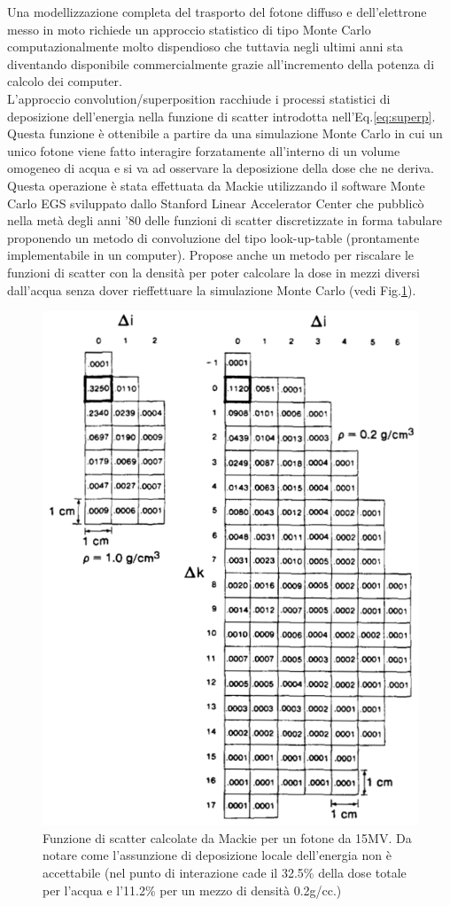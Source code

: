 {Una modellizzazione completa del trasporto del fotone diffuso e dell'elettrone messo in moto richiede un approccio statistico di tipo Monte Carlo computazionalmente molto dispendioso che tuttavia negli ultimi anni sta diventando disponibile commercialmente grazie all'incremento della potenza di calcolo dei computer.\\
L'approccio convolution/superposition racchiude i processi statistici di deposizione dell'energia nella funzione di scatter introdotta nell'Eq.\eqref{eq:superp}.\\
Questa funzione è ottenibile a partire da una simulazione Monte Carlo in cui un unico fotone viene fatto interagire forzatamente all'interno di un volume omogeneo di acqua e si va ad osservare la deposizione della dose che ne deriva.\\
Questa operazione è stata effettuata da Mackie \cite{Mackie1985} utilizzando il software Monte Carlo EGS sviluppato dallo Stanford Linear Accelerator Center che pubblicò nella metà degli anni '80 delle funzioni di scatter discretizzate in forma tabulare proponendo un metodo di convoluzione del tipo look-up-table (prontamente implementabile in un computer). Propose anche un metodo per riscalare le funzioni di scatter con la densità per poter calcolare la dose in mezzi diversi dall'acqua senza dover rieffettuare la simulazione Monte Carlo (vedi Fig.\ref{fig:mackie_kernels}).
\begin{figure}
\centering
\includegraphics[width=.8\textwidth]{./cap1/mackie_kernels.png}
\caption{Funzione di scatter calcolate da Mackie \cite{Mackie1985} per un fotone da 15MV. Da notare come l'assunzione di deposizione locale dell'energia non è accettabile (nel punto di interazione cade il 32.5\% della dose totale per l'acqua e l'11.2\% per un mezzo di densità 0.2g/cc.)}
\label{fig:mackie_kernels}
\end{figure}

}
